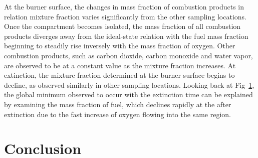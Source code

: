 \documentclass[12pt,letterpaper]{article}
\begin{document}
\begin{flushleft}
At the burner surface, the changes in mass fraction of combustion products in relation mixture fraction varies significantly from the other sampling locations. Once the compartment becomes isolated, the mass fraction of all combustion products diverges away from the ideal-state relation with the fuel mass fraction beginning to steadily rise inversely with the mass fraction of oxygen. Other combustion products, such as carbon dioxide, carbon monoxide and water vapor, are observed to be at a constant value as the mixture fraction increases. At extinction, the mixture fraction determined at the burner surface begins to decline, as observed similarly in other sampling locations. Looking back at Fig~\ref{}, the global minimum observed to occur with the extinction time can be explained by examining the mass fraction of fuel, which declines rapidly at the after extinction due to the fast increase of oxygen flowing into the same region. 



\section{Conclusion} \addvspace{10pt}
\label{sec:conc}

 



\end{flushleft}
\end{document}
